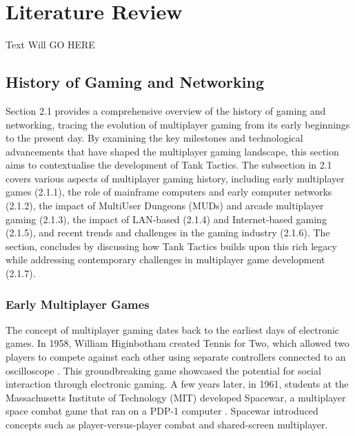 \chapter{Literature Review}
\label{ch:lit_rev} %

Text Will GO HERE

\section{History of Gaming and Networking}
Section 2.1 provides a comprehensive overview of the history of gaming and networking, tracing the evolution of multiplayer gaming from its early beginnings to the present day. By examining the key milestones and technological advancements that have shaped the multiplayer gaming landscape, this section aims to contextualise the development of Tank Tactics. The subsection in 2.1 covers various aspects of multiplayer gaming history, including early multiplayer games (2.1.1), the role of mainframe computers and early computer networks (2.1.2), the impact of MultiUser Dungeons (MUDs) and arcade multiplayer gaming (2.1.3), the impact of LAN-based (2.1.4) and Internet-based gaming (2.1.5), and recent trends and challenges in the gaming industry (2.1.6). The section, concludes by discussing how Tank Tactics builds upon this rich legacy while addressing contemporary challenges in multiplayer game development (2.1.7).

\subsection{Early Multiplayer Games}
The concept of multiplayer gaming dates back to the earliest days of electronic games. In 1958, William Higinbotham created Tennis for Two, which allowed two players to compete against each other using separate controllers connected to an oscilloscope \cite{arm2006networking}. This groundbreaking game showcased the potential for social interaction through electronic gaming. A few years later, in 1961, students at the Massachusetts Institute of Technology (MIT) developed Spacewar, a multiplayer space combat game that ran on a PDP-1 computer \cite{arm2006networking}. Spacewar introduced concepts such as player-versus-player combat and shared-screen multiplayer.

